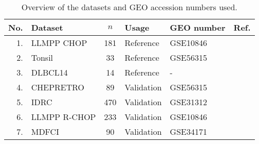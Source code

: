 \begin{table}%
\small
\caption{Overview of the datasets and GEO accession numbers used.}
\label{table:01}%
\begin{center}
\begin{tabular}{rlclll}
\hline\hline
No. & Dataset & $n$ & Usage & GEO number & Ref.
\\
\hline
1. & LLMPP CHOP & 181 & Reference & GSE10846 & \citep{Lenz2008a}
\\
2. & Tonsil & 33 & Reference & GSE56315 & \citep{DybkaerBoegsted2015}
\\
3. & DLBCL14 & 14 & Reference & - & \citep{Falgreen2015}
\\
4. & CHEPRETRO & 89 & Validation & GSE56315 & \citep{DybkaerBoegsted2015}
\\
5. & IDRC & 470 & Validation & GSE31312 & \citep{Visco2012}
\\
6. & LLMPP R-CHOP & 233 & Validation & GSE10846 & \citep{Lenz2008a}
\\
7. & MDFCI & 90 & Validation & GSE34171 & \citep{Monti2012a}\\
\hline
\end{tabular}
\end{center}
\end{table}
